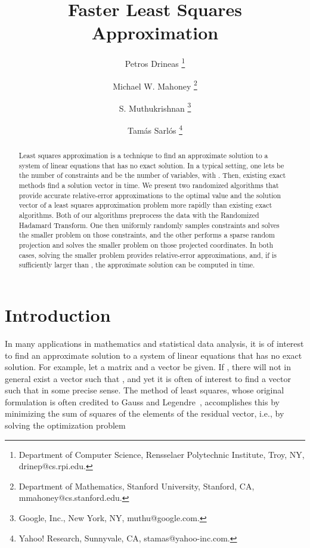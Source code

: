 \documentclass[11pt]{article}
\begin{document}
\title{Faster Least Squares Approximation}

\author{
Petros Drineas
\thanks{
Department of Computer Science,
Rensselaer Polytechnic Institute,
Troy, NY,
drinep@cs.rpi.edu.
}
\and Michael W. Mahoney
\thanks{
Department of Mathematics,
Stanford University,
Stanford, CA,
mmahoney@cs.stanford.edu.
}
\and S. Muthukrishnan
\thanks{
Google, Inc., New York, NY, muthu@google.com.}
\and Tam\'{a}s Sarl\'{o}s
\thanks{
Yahoo! Research, Sunnyvale, CA, stamas@yahoo-inc.com.}
}

\date{}
\maketitle
\vspace{5mm}

\begin{abstract}
Least squares approximation is a technique to find an approximate solution to a system of linear equations that has no exact solution. In a typical setting, one lets  be the number of constraints and  be the number of variables, with . Then, existing exact methods find a solution vector in  time. We present two randomized algorithms that provide accurate relative-error approximations to the optimal value and the solution vector of a least squares approximation problem more rapidly than existing exact algorithms. Both of our algorithms preprocess the data with the Randomized Hadamard Transform. One then uniformly randomly samples constraints and solves the smaller problem on those constraints, and the other performs a sparse random projection and solves the smaller problem on those projected coordinates. In both cases, solving the smaller problem provides relative-error approximations, and, if  is sufficiently larger than , the approximate solution can be computed in  time.
\end{abstract}

\vspace{5mm}
\section{Introduction}
\label{sxn:intro}

In many applications in mathematics and statistical data analysis, it is of interest to find an approximate solution to a system of linear equations that has no exact solution. For example, let a
matrix  and a vector  be given. If , there will not in general exist a vector  such that , and yet it is
often of interest to find a vector  such that  in some precise sense. The method of least squares, whose original formulation is often credited to Gauss and Legendre~\cite{Stigler86}, accomplishes this by minimizing the sum of squares of the elements of the residual vector, i.e., by solving the optimization problem
\end{document}
